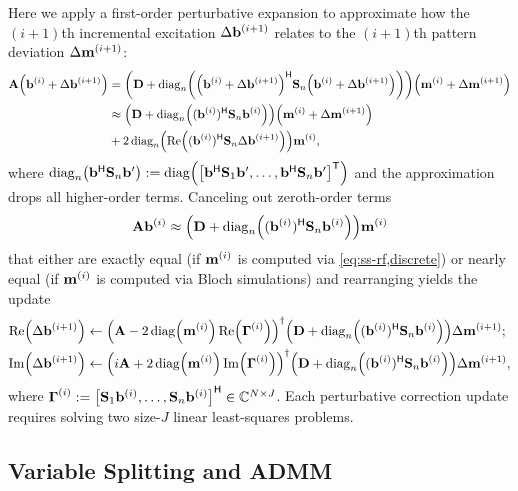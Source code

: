Here we apply a first-order perturbative expansion 
to approximate how the $(i+1)$th incremental excitation 
$\Delta \iter{\bmb}{i+1}$ 
relates to the $(i+1)$th pattern deviation 
$\Delta \iter{\bmm}{i+1}$: 
	\begin{align}
		\mathbf{A} \paren{\iter{\bmb}{i} + \Delta \iter{\bmb}{i+1}} &= 
			\paren{\bmD + \diagn{\paren{\iter{\bmb}{i} 
			+ \Delta \iter{\bmb}{i+1}}\ctpose \bmS_n \paren{\iter{\bmb}{i} 
			+ \Delta \iter{\bmb}{i+1}}}}
			\paren{\iter{\bmm}{i} + \Delta \iter{\bmm}{i+1}} 
			\label{eq:ss-rf,pert-ex} 
			\\
		&\approx 
			\paren{\bmD + \diagn{(\iter{\bmb}{i})\ctpose \bmS_n \iter{\bmb}{i}}}
			\paren{\iter{\bmm}{i} + \Delta \iter{\bmm}{i+1}} 
			\nonumber 
			\\
		&+ 
			2 \diagn{\re{(\iter{\bmb}{i})\ctpose 
			\bmS_n \Delta \iter{\bmb}{i+1}}} \iter{\bmm}{i}, 
			\label{eq:ss-rf,pert-apprx}
	\end{align}
where $\diagn{\bmb\ctpose\bmS_n\bmb'} :=
	\diag{\brac{\bmb\ctpose\bmS_1\bmb',\dots,\bmb\ctpose\bmS_n\bmb'}\tpose}$
and the approximation drops all higher-order terms.
Canceling out zeroth-order terms 
\begin{align}
	\bmA \iter{\bmb}{i} \approx
		\paren{\bmD + \diagn{(\iter{\bmb}{i})\ctpose\bmS_n\iter{\bmb}{i}}} \iter{\bmm}{i}
\end{align}
that either are exactly equal 
(if $\iter{\bmm}{i}$ is computed via \eqref{eq:ss-rf,discrete})
or nearly equal
(if $\iter{\bmm}{i}$ is computed via Bloch simulations)
and rearranging yields the update
\begin{align}
	\re{\Delta\iter{\bmb}{i+1}} &\gets
		\pinv{\bmA-2\diag{\iter{\bmm}{i}}\re{\iter{\bmG}{i}}}
		\paren{\bmD + \diagn{(\iter{\bmb}{i})\ctpose\bmS_n\iter{\bmb}{i}}}
		\Delta \iter{\bmm}{i+1};
		\nonumber
		\\
	\im{\Delta\iter{\bmb}{i+1}} &\gets
		\pinv{i\bmA+2\diag{\iter{\bmm}{i}}\im{\iter{\bmG}{i}}}
		\paren{\bmD + \diagn{(\iter{\bmb}{i})\ctpose\bmS_n\iter{\bmb}{i}}}
		\Delta \iter{\bmm}{i+1},
	\label{eq:ss-rf,pert-update}
\end{align}
where $\iter{\bmG}{i} := 
	\brac{\bmS_1\iter{\bmb}{i},\dots,\bmS_n\iter{\bmb}{i}}\ctpose 
	\in \complexes{N \times J}$.
Each perturbative correction update
requires solving two size-$J$ linear least-squares problems.

\subsection{Variable Splitting and ADMM}
\label{ss,ss-rf,alg,admm}
	
